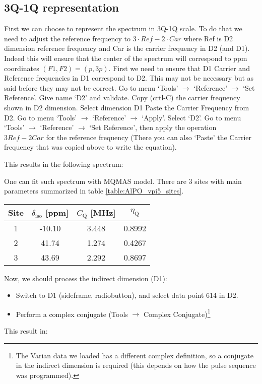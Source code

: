 \documentclass[11pt,a4paper]{article}
\begin{document}
\subsection{3Q-1Q representation}
First we can choose to represent the spectrum in 3Q-1Q scale. To do that we need to adjust the reference frequency to $3 \cdot Ref - 2 \cdot Car$
where Ref is D2 dimension reference frequency and Car is the carrier frequency in D2 (and D1). Indeed this will ensure that the center 
of the spectrum will correspond to ppm coordinates $(F1, F2)= (p, 3p)$.
First we need to ensure that D1 Carrier and Reference frequencies in D1 correspond to D2. This may not be necessary but as said before
they may not be correct.
Go to menu `Tools' $\longrightarrow$ `Reference' $\longrightarrow$ `Set Reference'. Give name `D2' and validate.
Copy (crtl-C) the carrier frequency shown in D2 dimension. 
Select dimension D1
Paste the Carrier Frequency from D2.
Go to menu `Tools' $\longrightarrow$ `Reference' $\longrightarrow$ `Apply'. Select `D2'.
Go to menu `Tools' $\longrightarrow$ `Reference' $\longrightarrow$ `Set Reference', then apply the operation $3 Ref - 2 Car$ for 
the reference frequency (There you can also `Paste' the Carrier frequency that was copied above to write the equation).

This results in the following spectrum:
\begin{center}
\end{center}

One can fit such spectrum with MQMAS model. There are 3 sites with main parameters summarized in table \ref{table:AlPO_vpi5_sites}.

\begin{center}\label{table:AlPO_vpi5_sites}
  \begin{tabular}{c|c c c} 
	 \toprule
	 Site & $\delta_\text{iso}$ [ppm]& $C_\text{Q}$ [MHz] & $\eta_\text{Q}$ \\
	 \midrule
 1 & -10.10      &   3.448     &          0.8992       \\
 2 &  41.74      &   1.274     &          0.4267       \\
 3 &  43.69      &   2.292     &          0.8697       \\
	\bottomrule
  \end{tabular}
\end{center}

Now, we should process the indirect dimension (D1):
\begin{itemize}
	\item Switch to D1 (sideframe, radiobutton), and select data point 614 in D2.
	\item Perform a complex conjugate (Tools $\longrightarrow$ Complex Conjugate)\footnote{The Varian data
	  we loaded has a different complex definition, so a conjugate in the indirect dimension is
	required (this depends on how the pulse sequence was programmed).}
\end{itemize}
This result in:
\begin{center}
\end{center}
\end{document}
